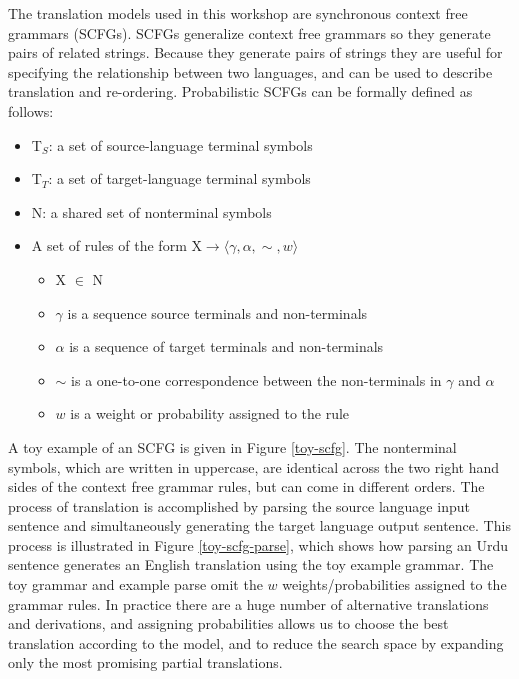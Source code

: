 The translation models used in this workshop are synchronous context free grammars (SCFGs).
SCFGs \cite{lewis68scfg}  generalize  context free grammars so they generate pairs of related strings.  
Because they generate pairs of strings they are useful for specifying the relationship between two languages, and can be used to describe translation and re-ordering.  
Probabilistic SCFGs can be formally defined as follows:
\begin{itemize}
\item T$_{S}$: a set of source-language terminal symbols
\item T$_{T}$: a set of target-language terminal symbols
\item N: a shared set of nonterminal symbols
\item A set of rules of the form  $\text{X} \rightarrow \langle \gamma, \alpha, \sim, w \rangle$
	\begin{itemize}
	\item X $\in$ N
	\item $\gamma$ is a sequence source terminals and non-terminals
	\item $\alpha$ is a sequence of target terminals and non-terminals
	\item $\sim$ is a one-to-one correspondence between the non-terminals in  $\gamma$  and $\alpha$
	\item $w$ is a weight or probability assigned to the rule
	\end{itemize}
\end{itemize}



A toy example of an SCFG is given in Figure \ref{toy-scfg}.  The nonterminal symbols, which are written in uppercase, are identical across the two right hand sides of the context free grammar rules, but can come in different orders. 
The process of translation is accomplished by parsing the source language input sentence and simultaneously generating the target language output sentence.  This
process is illustrated in Figure \ref{toy-scfg-parse}, which shows how parsing an  Urdu sentence generates an English translation using the toy example grammar.  The toy grammar and example parse omit the $w$ weights/probabilities assigned to the grammar rules.  In practice there are a huge number of alternative translations and derivations, and assigning probabilities allows us to choose the best translation according to the model, and to reduce the search space by expanding only the most promising partial translations. 

